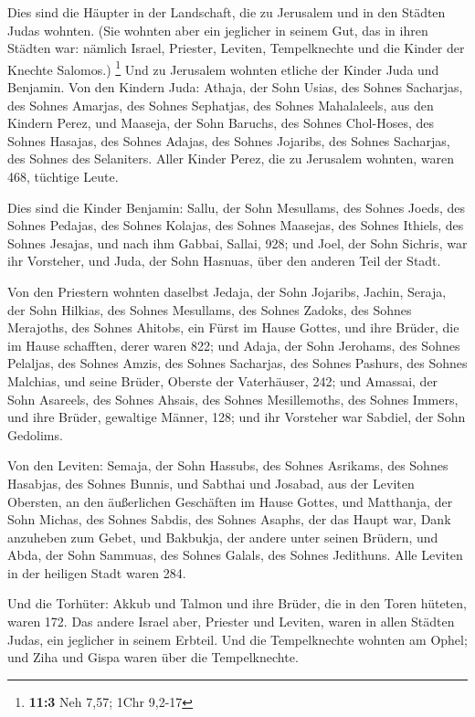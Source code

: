 Dies sind die Häupter in der Landschaft, die zu Jerusalem
und in den Städten Judas wohnten. (Sie wohnten aber ein jeglicher in
seinem Gut, das in ihren Städten war: nämlich Israel, Priester, Leviten,
Tempelknechte und die Kinder der Knechte Salomos.) \footnote{\textbf{11:3}
  Neh 7,57; 1Chr 9,2-17}  Und zu Jerusalem wohnten etliche
der Kinder Juda und Benjamin. Von den Kindern Juda: Athaja, der Sohn
Usias, des Sohnes Sacharjas, des Sohnes Amarjas, des Sohnes Sephatjas,
des Sohnes Mahalaleels, aus den Kindern Perez,  und Maaseja,
der Sohn Baruchs, des Sohnes Chol-Hoses, des Sohnes Hasajas, des Sohnes
Adajas, des Sohnes Jojaribs, des Sohnes Sacharjas, des Sohnes des
Selaniters.  Aller Kinder Perez, die zu Jerusalem wohnten,
waren 468, tüchtige Leute.

 Dies sind die Kinder Benjamin: Sallu, der Sohn Mesullams,
des Sohnes Joeds, des Sohnes Pedajas, des Sohnes Kolajas, des Sohnes
Maasejas, des Sohnes Ithiels, des Sohnes Jesajas,  und nach
ihm Gabbai, Sallai, 928;  und Joel, der Sohn Sichris, war
ihr Vorsteher, und Juda, der Sohn Hasnuas, über den anderen Teil der
Stadt.

 Von den Priestern wohnten daselbst Jedaja, der Sohn
Jojaribs, Jachin,  Seraja, der Sohn Hilkias, des Sohnes
Mesullams, des Sohnes Zadoks, des Sohnes Merajoths, des Sohnes Ahitobs,
ein Fürst im Hause Gottes,  und ihre Brüder, die im Hause
schafften, derer waren 822; und Adaja, der Sohn Jerohams, des Sohnes
Pelaljas, des Sohnes Amzis, des Sohnes Sacharjas, des Sohnes Pashurs,
des Sohnes Malchias,  und seine Brüder, Oberste der
Vaterhäuser, 242; und Amassai, der Sohn Asareels, des Sohnes Ahsais, des
Sohnes Mesillemoths, des Sohnes Immers,  und ihre Brüder,
gewaltige Männer, 128; und ihr Vorsteher war Sabdiel, der Sohn Gedolims.

 Von den Leviten: Semaja, der Sohn Hassubs, des Sohnes
Asrikams, des Sohnes Hasabjas, des Sohnes Bunnis,  und
Sabthai und Josabad, aus der Leviten Obersten, an den äußerlichen
Geschäften im Hause Gottes,  und Matthanja, der Sohn
Michas, des Sohnes Sabdis, des Sohnes Asaphs, der das Haupt war, Dank
anzuheben zum Gebet, und Bakbukja, der andere unter seinen Brüdern, und
Abda, der Sohn Sammuas, des Sohnes Galals, des Sohnes Jedithuns.
 Alle Leviten in der heiligen Stadt waren 284.

 Und die Torhüter: Akkub und Talmon und ihre Brüder, die in
den Toren hüteten, waren 172.  Das andere Israel aber,
Priester und Leviten, waren in allen Städten Judas, ein jeglicher in
seinem Erbteil.  Und die Tempelknechte wohnten am Ophel;
und Ziha und Gispa waren über die Tempelknechte.

